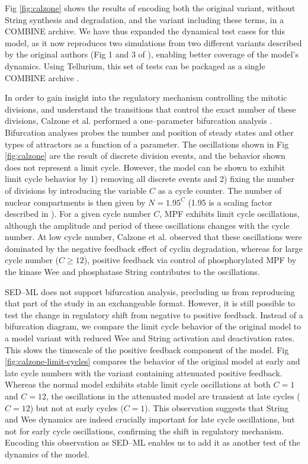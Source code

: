 \documentclass[10pt,letterpaper]{article}
\begin{document}
Fig \ref{fig:calzone} shows the results of encoding both the original variant, without String synthesis and degradation, and the variant including these terms, in a COMBINE archive. We have thus expanded the dynamical test cases for this model, as it now reproduces two simulations from two different variants described by the original authors (Fig 1 and 3 of \cite{calzone2007dynamical}), enabling better coverage of the model's dynamics. Using Tellurium, this set of tests can be packaged as a single COMBINE archive \cite{calzone-fig1-fig3}.

In order to gain insight into the regulatory mechanism controlling the mitotic divisions, and understand the transitions that control the exact number of these divisions, Calzone et al. performed a one--parameter bifurcation analysis \cite{calzone2007dynamical}. Bifurcation analyses probes the number and position of steady states and other types of attractors as a function of a parameter. The oscillations shown in Fig \ref{fig:calzone} are the result of discrete division events, and the behavior shown does not represent a limit cycle. However, the model can be shown to exhibit limit cycle behavior by 1) removing all discrete events and 2) fixing the number of divisions by introducing the variable $C$ as a cycle counter. The number of nuclear compartments is then given by $N = 1.95^C$ (1.95 is a scaling factor described in \cite{calzone2007dynamical}). For a given cycle number $C$, MPF exhibits limit cycle oscillations, although the amplitude and period of these oscillations changes with the cycle number. At low cycle number, Calzone et al. observed that these oscillations were dominated by the negative feedback effect of cyclin degradation, whereas for large cycle number ($C \ge 12$), positive feedback via control of phosphorylated MPF by the kinase Wee and phosphatase String contributes to the oscillations.

SED--ML does not support bifurcation analysis, precluding us from reproducing that part of the study in an exchangeable format. However, it is still possible to test the change in regulatory shift from negative to positive feedback. Instead of a bifurcation diagram, we compare the limit cycle behavior of the original model to a model variant with reduced Wee and String activation and deactivation rates. This slows the timescale of the positive feedback component of the model. Fig \ref{fig:calzone-limit-cycles} compares the behavior of the original model at early and late cycle numbers with the variant containing attenuated positive feedback. Whereas the normal model exhibits stable limit cycle oscillations at both $C=1$ and $C=12$, the oscillations in the attenuated model are transient at late cycles ($C=12$) but not at early cycles ($C=1$). This observation suggests that String and Wee dynamics are indeed crucially important for late cycle oscillations, but not for early cycle oscillations, confirming the shift in regulatory mechanism. Encoding this observation as SED--ML enables us to add it as another test of the dynamics of the model.
\end{document}
